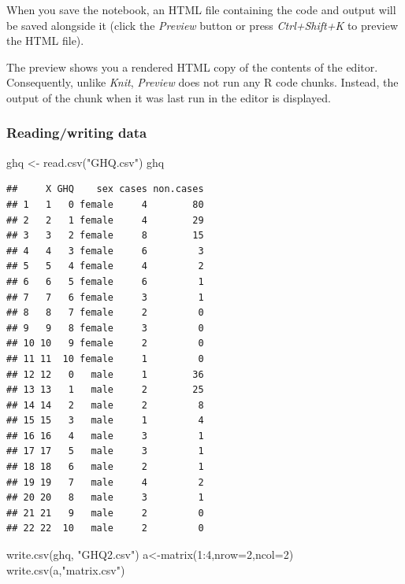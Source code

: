 \documentclass[]{article}
\newenvironment{Shaded}{\begin{snugshade}}{\end{snugshade}}
\newcommand{\AttributeTok}[1]{\textcolor[rgb]{0.77,0.63,0.00}{#1}}
\newcommand{\DecValTok}[1]{\textcolor[rgb]{0.00,0.00,0.81}{#1}}
\newcommand{\FunctionTok}[1]{\textcolor[rgb]{0.00,0.00,0.00}{#1}}
\newcommand{\NormalTok}[1]{#1}
\newcommand{\OtherTok}[1]{\textcolor[rgb]{0.56,0.35,0.01}{#1}}
\newcommand{\SpecialCharTok}[1]{\textcolor[rgb]{0.00,0.00,0.00}{#1}}
\newcommand{\StringTok}[1]{\textcolor[rgb]{0.31,0.60,0.02}{#1}}
\begin{document}
When you save the notebook, an HTML file containing the code and output
will be saved alongside it (click the \emph{Preview} button or press
\emph{Ctrl+Shift+K} to preview the HTML file).

The preview shows you a rendered HTML copy of the contents of the
editor. Consequently, unlike \emph{Knit}, \emph{Preview} does not run
any R code chunks. Instead, the output of the chunk when it was last run
in the editor is displayed.

\hypertarget{readingwriting-data}{%
\subsubsection{Reading/writing data}\label{readingwriting-data}}

\begin{Shaded}
\begin{Highlighting}[]
\NormalTok{ghq }\OtherTok{\textless{}{-}} \FunctionTok{read.csv}\NormalTok{(}\StringTok{"GHQ.csv"}\NormalTok{)}
\NormalTok{ghq}
\end{Highlighting}
\end{Shaded}

\begin{verbatim}
##     X GHQ    sex cases non.cases
## 1   1   0 female     4        80
## 2   2   1 female     4        29
## 3   3   2 female     8        15
## 4   4   3 female     6         3
## 5   5   4 female     4         2
## 6   6   5 female     6         1
## 7   7   6 female     3         1
## 8   8   7 female     2         0
## 9   9   8 female     3         0
## 10 10   9 female     2         0
## 11 11  10 female     1         0
## 12 12   0   male     1        36
## 13 13   1   male     2        25
## 14 14   2   male     2         8
## 15 15   3   male     1         4
## 16 16   4   male     3         1
## 17 17   5   male     3         1
## 18 18   6   male     2         1
## 19 19   7   male     4         2
## 20 20   8   male     3         1
## 21 21   9   male     2         0
## 22 22  10   male     2         0
\end{verbatim}

\begin{Shaded}
\begin{Highlighting}[]
\FunctionTok{write.csv}\NormalTok{(ghq, }\StringTok{"GHQ2.csv"}\NormalTok{)}
\NormalTok{a}\OtherTok{\textless{}{-}}\FunctionTok{matrix}\NormalTok{(}\DecValTok{1}\SpecialCharTok{:}\DecValTok{4}\NormalTok{,}\AttributeTok{nrow=}\DecValTok{2}\NormalTok{,}\AttributeTok{ncol=}\DecValTok{2}\NormalTok{)}
\FunctionTok{write.csv}\NormalTok{(a,}\StringTok{"matrix.csv"}\NormalTok{)}
\end{Highlighting}
\end{Shaded}
\end{document}
